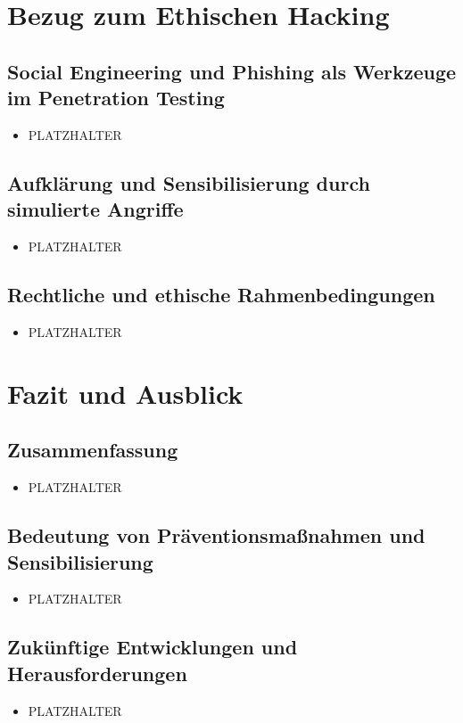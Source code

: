\documentclass[12pt, a4paper, oneside]{scrartcl}
\begin{document}
\section{Bezug zum Ethischen Hacking}

\subsection{Social Engineering und Phishing als Werkzeuge im Penetration Testing}
\begin{itemize}
  \item PLATZHALTER
\end{itemize}

\subsection{Aufklärung und Sensibilisierung durch simulierte Angriffe}
\begin{itemize}
  \item PLATZHALTER
\end{itemize}

\subsection{Rechtliche und ethische Rahmenbedingungen}
\begin{itemize}
  \item PLATZHALTER
\end{itemize}

\section{Fazit und Ausblick}

\subsection{Zusammenfassung}
\begin{itemize}
  \item PLATZHALTER
\end{itemize}

\subsection{Bedeutung von Präventionsmaßnahmen und Sensibilisierung}
\begin{itemize}
  \item PLATZHALTER
\end{itemize}

\subsection{Zukünftige Entwicklungen und Herausforderungen}
\begin{itemize}
  \item PLATZHALTER
\end{itemize}

\clearpage
\printbibliography[title={Literaturverzeichnis}]
\end{document}
